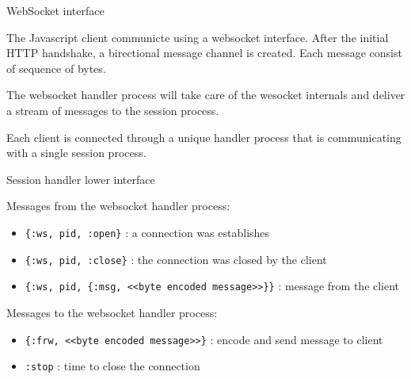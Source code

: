 \begin{frame}{WebSocket interface}

  The Javascript client communicte using a websocket interface. After
  the initial HTTP handshake, a birectional message channel is
  created. Each message consist of sequence of bytes.

  \pause\vspace{10pt}
  
  

  \pause\vspace{10pt}
  
  The websocket handler process will take care of the wesocket
  internals and deliver a stream of messages to the session process.

  \pause

  Each client is connected through a unique handler process that is
  communicating with a single session process.

\end{frame}

\begin{frame}{Session handler lower interface}

Messages from the websocket handler process:

\vspace{10pt}  \pause

\begin{itemize}
\item {\tt \{:ws, pid, :open\}}  : a connection was establishes
\item {\tt \{:ws, pid, :close\}}  : the connection was closed by the client
\item {\tt \{:ws, pid, \{:msg,  <<byte encoded message>>\}\}} : message from the client
\end{itemize}

\vspace{10pt}  \pause

Messages to the websocket handler process:

\begin{itemize}
\item {\tt \{:frw, <<byte encoded message>>\}}  : encode and send message to client
\item {\tt :stop} : time to close the connection
\end{itemize}

\end{frame}

